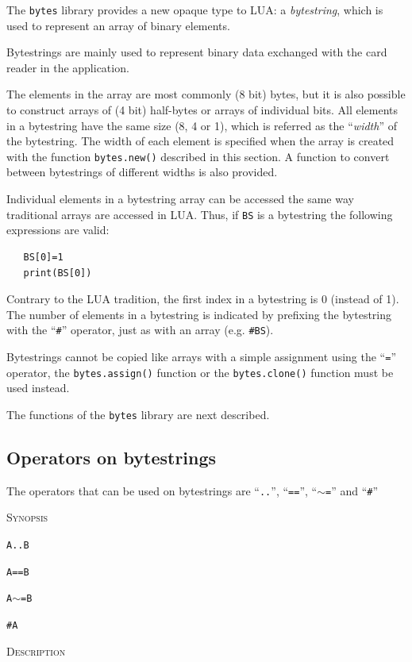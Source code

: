 \documentclass[11pt]{report}
\newcommand{\mansection}[1]{\vspace{0.5em}\par\noindent\textsc{#1}\vspace{0.5em}\par}
\newcommand{\syn}[1]{\texttt{#1}}
\begin{document}
The \syn{bytes} library provides a new opaque type to LUA: a \textit{bytestring}, 
which is used to represent an array of binary elements. 

Bytestrings are mainly used to represent binary data exchanged with
the card reader in the application.

The elements in the array are most commonly (8 bit) bytes, but
it is also possible to construct arrays of (4 bit) half-bytes or
arrays of individual bits. All elements in a bytestring have the same
size (8, 4 or 1), which is referred as the ``\emph{width}'' of the bytestring.
The width of each element is specified when the array is created 
with the function \syn{bytes.new()} described in this section. 
A function to convert between bytestrings of different widths 
is also provided.

Individual elements in a bytestring array can be accessed the same 
way traditional arrays are accessed in LUA. Thus, if \syn{BS} is
a bytestring the following expressions are valid:

\begin{verbatim}
   BS[0]=1
   print(BS[0])
\end{verbatim} 

Contrary to the LUA tradition, the first index in a bytestring is 0
(instead of 1). The number of elements in a bytestring is indicated 
by prefixing the bytestring with the ``\syn{\#}'' operator, just as 
with an array (e.g. \syn{\#BS}).

Bytestrings cannot be copied like arrays with a simple assignment 
using the ``\syn{=}'' operator, the \syn{bytes.assign()} function
or the \syn{bytes.clone()} function must be used instead.  

The functions of the \syn{bytes} library are next described.

\subsection{Operators on bytestrings}
  
The operators that can be used on bytestrings are ``\syn{..}'', ``\syn{==}'', ``\syn{$\sim$=}'' and ``\syn{\#}''

\mansection{Synopsis}

\syn{A..B} 

\syn{A==B}

\syn{A$\sim$=B}

\syn{\#A}

\mansection{Description}
  
\end{document}
